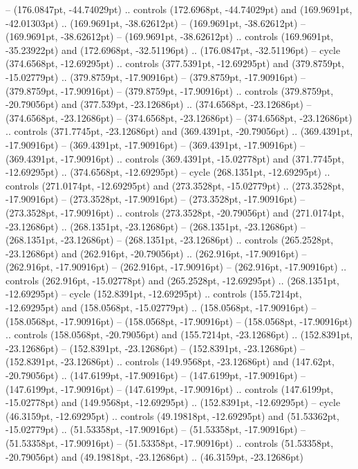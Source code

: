  -- (176.0847pt, -44.74029pt) .. controls (172.6968pt, -44.74029pt) and (169.9691pt, -42.01303pt) .. (169.9691pt, -38.62612pt)
 -- (169.9691pt, -38.62612pt)
 -- (169.9691pt, -38.62612pt)
 -- (169.9691pt, -38.62612pt) .. controls (169.9691pt, -35.23922pt) and (172.6968pt, -32.51196pt) .. (176.0847pt, -32.51196pt) -- cycle
(374.6568pt, -12.69295pt) .. controls (377.5391pt, -12.69295pt) and (379.8759pt, -15.02779pt) .. (379.8759pt, -17.90916pt)
 -- (379.8759pt, -17.90916pt)
 -- (379.8759pt, -17.90916pt)
 -- (379.8759pt, -17.90916pt) .. controls (379.8759pt, -20.79056pt) and (377.539pt, -23.12686pt) .. (374.6568pt, -23.12686pt)
 -- (374.6568pt, -23.12686pt)
 -- (374.6568pt, -23.12686pt)
 -- (374.6568pt, -23.12686pt) .. controls (371.7745pt, -23.12686pt) and (369.4391pt, -20.79056pt) .. (369.4391pt, -17.90916pt)
 -- (369.4391pt, -17.90916pt)
 -- (369.4391pt, -17.90916pt)
 -- (369.4391pt, -17.90916pt) .. controls (369.4391pt, -15.02778pt) and (371.7745pt, -12.69295pt) .. (374.6568pt, -12.69295pt) -- cycle
(268.1351pt, -12.69295pt) .. controls (271.0174pt, -12.69295pt) and (273.3528pt, -15.02779pt) .. (273.3528pt, -17.90916pt)
 -- (273.3528pt, -17.90916pt)
 -- (273.3528pt, -17.90916pt)
 -- (273.3528pt, -17.90916pt) .. controls (273.3528pt, -20.79056pt) and (271.0174pt, -23.12686pt) .. (268.1351pt, -23.12686pt)
 -- (268.1351pt, -23.12686pt)
 -- (268.1351pt, -23.12686pt)
 -- (268.1351pt, -23.12686pt) .. controls (265.2528pt, -23.12686pt) and (262.916pt, -20.79056pt) .. (262.916pt, -17.90916pt)
 -- (262.916pt, -17.90916pt)
 -- (262.916pt, -17.90916pt)
 -- (262.916pt, -17.90916pt) .. controls (262.916pt, -15.02778pt) and (265.2528pt, -12.69295pt) .. (268.1351pt, -12.69295pt) -- cycle
(152.8391pt, -12.69295pt) .. controls (155.7214pt, -12.69295pt) and (158.0568pt, -15.02779pt) .. (158.0568pt, -17.90916pt)
 -- (158.0568pt, -17.90916pt)
 -- (158.0568pt, -17.90916pt)
 -- (158.0568pt, -17.90916pt) .. controls (158.0568pt, -20.79056pt) and (155.7214pt, -23.12686pt) .. (152.8391pt, -23.12686pt)
 -- (152.8391pt, -23.12686pt)
 -- (152.8391pt, -23.12686pt)
 -- (152.8391pt, -23.12686pt) .. controls (149.9568pt, -23.12686pt) and (147.62pt, -20.79056pt) .. (147.6199pt, -17.90916pt)
 -- (147.6199pt, -17.90916pt)
 -- (147.6199pt, -17.90916pt)
 -- (147.6199pt, -17.90916pt) .. controls (147.6199pt, -15.02778pt) and (149.9568pt, -12.69295pt) .. (152.8391pt, -12.69295pt) -- cycle
(46.3159pt, -12.69295pt) .. controls (49.19818pt, -12.69295pt) and (51.53362pt, -15.02779pt) .. (51.53358pt, -17.90916pt)
 -- (51.53358pt, -17.90916pt)
 -- (51.53358pt, -17.90916pt)
 -- (51.53358pt, -17.90916pt) .. controls (51.53358pt, -20.79056pt) and (49.19818pt, -23.12686pt) .. (46.3159pt, -23.12686pt)
